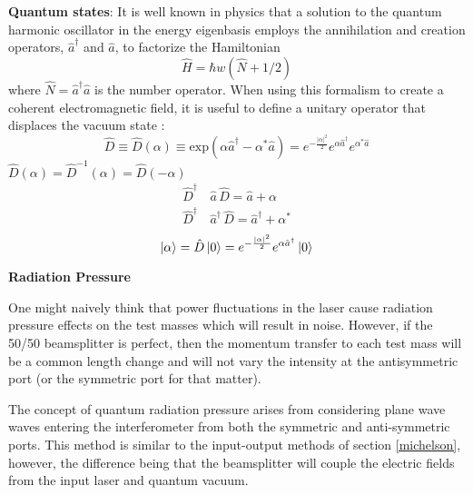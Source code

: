 		\textbf{Quantum states}:
		It is well known in physics \cite{Shankar} \cite{Griffiths} that a solution to the quantum harmonic oscillator in the energy eigenbasis employs the annihilation and creation  operators, $\hat{a}^{\dagger}$ and $\hat{a}$, to factorize the Hamiltonian
		\begin{equation}
		\hat{H} = \hbar w (\hat{N} + 1/2)
		\end{equation} 
		where $\hat{N} = \hat{a}^{\dagger}  \hat{a}$ is the number operator.  When using this formalism to create a coherent electromagnetic field, it is useful to define a unitary operator that displaces the vacuum state \cite{GerryKnight}:
		\begin{equation}
		\hat{D} \equiv \hat{D}(\alpha) \equiv \text{exp}(\alpha \hat{a}^{\dagger} - \alpha^{*} \hat{a} ) = e^{-\frac{\vert{\alpha}\vert^2}{2}} e^{\alpha \hat{a}^{\dagger} } e^{\alpha^{*} \hat{a} }
		\end{equation}
		$\hat{D}(\alpha) = \hat{D}^{-1}(\alpha) = \hat{D}(-\alpha)$
		\begin{equation}
		\begin{aligned}
		\hat{D}^\dagger&\, \hat{a} 		\,\hat{D}			= \hat{a} + \alpha \\ 
		\hat{D}^\dagger&\, \hat{a}^\dagger \,\hat{D} 		= \hat{a}^\dagger + \alpha^*
		\end{aligned}
		\end{equation}
		\begin{equation}
		\ket{\alpha} = \hat{D} \ket{0} =  e^{-\frac{\vert{\alpha}\vert^2}{2}} e^{\alpha \hat{a}^{\dagger} } \ket{0}
		\end{equation}
		
		
		\textbf{Radiation Pressure}
		
		One might naively think that power fluctuations in the laser cause radiation pressure effects on the test masses which will result in noise.  However, if the 50/50 beamsplitter is perfect, then the momentum transfer to each test mass will be a common length change and will not vary the intensity at the antisymmetric port (or the symmetric port for that matter).
		
		The concept of quantum radiation pressure arises from considering plane wave waves entering the interferometer from both the symmetric and anti-symmetric ports.  This method is similar to the input-output methods of section \ref{michelson}, however, the difference being that the beamsplitter will couple the electric fields from the input laser and quantum vacuum.
		

